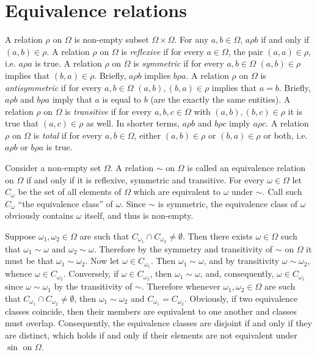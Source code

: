 \documentclass[a4paper]{article}
\newcommand{\brac}[1]{{\left({#1}\right)}}
\begin{document}
\section{Equivalence relations} %
\label{sec:equivalence_relations}
A relation $\rho$ on $\Omega$ is non-empty subset $\Omega\times \Omega$. For any $a, b\in \Omega$, $a\rho b$ if and only if $\brac{a, b}\in \rho$.
A relation $\rho$ on $\Omega$ is \emph{reflexive} if for every $a\in \Omega$, the pair $\brac{a, a}\in \rho$, i.e. $a\rho a$ is true.
A relation $\rho$ on $\Omega$ is \emph{symmetric} if for every $a,b\in \Omega$ $\brac{a,b}\in \rho$ implies that $\brac{b,a}\in \rho$. Briefly, $a\rho b$ implies $b\rho a$.
A relation $\rho$ on $\Omega$ is \emph{antisymmetric} if for every $a,b\in \Omega$ $\brac{a,b}, \brac{b,a}\in \rho$ implies that $a=b$. Briefly, $a\rho b$ and $b\rho a$ imply that $a$ is equal to $b$ (are the exactly the same entities).
A relation $\rho$ on $\Omega$ is \emph{transitive} if for every $a,b,c\in \Omega$ with $\brac{a,b}, \brac{b,c}\in \rho$ it is true that $\brac{a,c}\in \rho$ as well. In shorter terms, $a\rho b$ and $b\rho c$ imply $a\rho c$.
A relation $\rho$ on $\Omega$ is \emph{total} if for every $a, b\in \Omega$, either $\brac{a, b}\in \rho$ or $\brac{b, a}\in \rho$ or both, i.e. $a\rho b$ or $b\rho a$ is true.

Consider a non-empty set $\Omega$. A relation $\sim$ on $\Omega$ is called an equivalence relation on $\Omega$ if and only if it is reflexive, symmetric and transitive. For every $\omega\in \Omega$ let $C_\omega$ be the set of all elements of $\Omega$ which are equivalent to $\omega$ under $\sim$. Call such $C_\omega$ ``the equivalence class'' of $\omega$. Since $\sim$ is symmetric, the equivalence class of $\omega$ obviously contains $\omega$ itself, and thus is non-empty.

Suppose $\omega_1, \omega_2\in \Omega$ are such that $C_{\omega_1}\cap C_{\omega_2}\neq \emptyset$. Then there exists $\omega\in \Omega$ such that $\omega_1\sim \omega$ and $\omega_2\sim \omega$. Therefore by the symmetry and transitivity of $\sim$ on $\Omega$ it must be that $\omega_1\sim \omega_2$.
Now let $\omega\in C_{\omega_1}$. Then $\omega_1\sim \omega$, and by transitivity $\omega\sim \omega_2$, whence $\omega\in C_{\omega_2}$. Conversely, if $\omega\in C_{\omega_2}$, then $\omega_1\sim \omega$, and, consequently, $\omega\in C_{\omega_1}$ since $\omega\sim \omega_1$ by the transitivity of $\sim$.
Therefore whenever $\omega_1, \omega_2\in \Omega$ are such that $C_{\omega_1}\cap C_{\omega_2}\neq \emptyset$, then $\omega_1\sim \omega_2$ and $C_{\omega_1}=C_{\omega_2}$. Obviously, if two equivalence classes coincide, then their members are equivalent to one another and classes must overlap. Consequently, the equivalence classes are disjoint if and only if they are distinct, which holds if and only if their elements are not equivalent under $\sin$ on $\Omega$.
\end{document}
